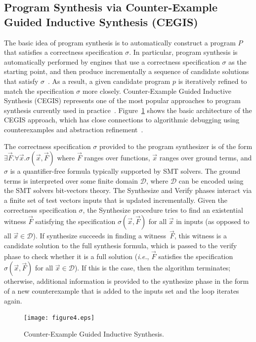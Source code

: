 \documentclass{acm_sen_article}
\begin{document}
\subsection{Program Synthesis via Counter-Example \\ Guided Inductive Synthesis (CEGIS)}

The basic idea of program synthesis is to automatically construct a program $P$ that satisfies a correctness specification $\sigma$. In particular, program synthesis is automatically performed by engines that use a correctness specification $\sigma$ as the starting point, and then produce incrementally a sequence of candidate solutions that satisfy $\sigma$~\cite{Abate17}. As a result, a given candidate program $p$ is iteratively refined to match the specification $\sigma$ more closely. Counter-Example Guided Inductive Synthesis (CEGIS) represents one of the most popular approaches to program synthesis currently used in practice~\cite{David15}. Figure~\ref{Counter-Example-Guided-Inductive-Synthesis} shows the basic architecture of the CEGIS approach, which has close connections to algorithmic debugging using counterexamples and abstraction refinement~\cite{Alur13}. 

The correctness specification $\sigma$ provided to the program synthesizer is of the form $\exists \vec{F} .  \forall \vec{x}.  \sigma(\vec{x}, \vec{F})$ where $\vec{F}$ ranges over functions, $\vec{x}$ ranges over ground terms, and $\sigma$ is a quantifier-free formula typically supported by SMT solvers. The ground terms is interpreted over some finite domain $\mathcal{D}$, where $\mathcal{D}$ can be encoded using the SMT solvers bit-vectors theory. The {\sc Synthesize} and {\sc Verify} phases interact via a finite set of test vectors {\sc inputs} that is updated incrementally. Given the correctness specification $\sigma$, the {\sc Synthesize} procedure tries to find an existential witness $\vec{F}$ satisfying the specification $\sigma(\vec{x}, \vec{F})$ for all $\vec{x}$ in {\sc inputs} (as opposed to all $\vec{x} \in \mathcal{D}$). If {\sc synthesize} succeeds in finding a witness~$\vec{F}$, this witness is a candidate solution to the full synthesis formula, which is passed to the {\sc verify} phase to check whether it is a full solution ({\it i.e.}, $\vec{F}$ satisfies the specification $\sigma(\vec{x}, \vec{F})$ for all $\vec{x}\in\mathcal{D}$). If this is the case, then the algorithm terminates; otherwise, additional information is provided to the {\sc synthesize} phase in the form of a new counterexample that is added to the {\sc inputs} set and the loop iterates again. 
%
\begin{figure}[h]
	\centering
	\texttt{[image: figure4.eps]}
	\caption{Counter-Example Guided Inductive Synthesis.}
	\label{Counter-Example-Guided-Inductive-Synthesis}
\end{figure}
\end{document}
